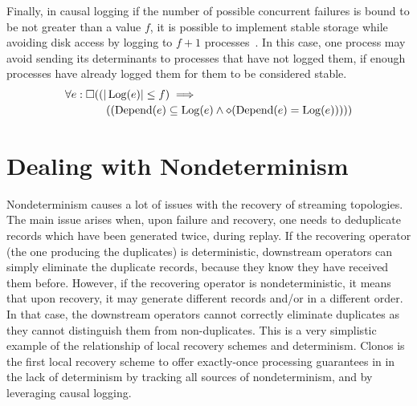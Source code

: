 \documentclass[sigconf]{acmart}
\DeclareMathOperator{\Depend}{Depend}
\DeclareMathOperator{\Log}{Log}
\begin{document}
Finally, in causal logging if the number of possible concurrent failures is bound to be not greater than a value $f$, it is possible to implement stable storage while avoiding disk access by logging to $f + 1$ processes~\cite{alvisi1993nonblocking}.
In this case, one process may avoid sending its determinants to processes that have not logged them, if enough processes have already logged them for them to be considered stable. %
\begin{equation}\label{eq:causalbounded}
\begin{multlined}
\small
  \forall e: \square ( (|\Log(e)| \leq f)  \implies \\
   ~~~~~~~~((\Depend(e) \subseteq \Log(e) \wedge \diamond (\Depend(e) = \Log(e)))))
\end{multlined}
\end{equation}



\section{Dealing with Nondeterminism}
\label{sec:nondeterminism}

Nondeterminism causes a lot of issues with the recovery of streaming topologies. The main issue arises when, upon failure and recovery, one needs to deduplicate records which have been generated twice, during replay. If the recovering operator (the one producing the duplicates) is deterministic, downstream operators can simply eliminate the duplicate records, because they know they have received them before. However, if the recovering operator is nondeterministic, it means that upon recovery, it may generate different records and/or in a different order. In that case, the downstream operators cannot correctly eliminate duplicates as they cannot distinguish them from non-duplicates. This is a very simplistic example of the relationship of local recovery schemes and determinism.  Clonos is the first local recovery scheme to offer exactly-once processing guarantees in in the lack of determinism by tracking all sources of nondeterminism, and by leveraging causal logging.
\end{document}
